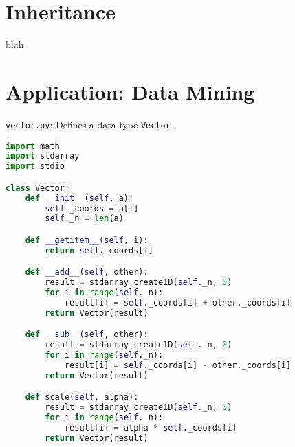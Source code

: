 \documentclass[8pt,a4paper,compress,handout]{beamer}
\begin{document}
\section{Inheritance}
\begin{frame}[fragile]
blah
\end{frame}

\section{Application: Data Mining}
\begin{frame}[fragile]
\begin{framed}
\tiny \lstinline{vector.py}: Defines a data type \lstinline{Vector}.
\end{framed}

\begin{lstlisting}[language=Python]
import math
import stdarray
import stdio

class Vector:
    def __init__(self, a):
        self._coords = a[:]
        self._n = len(a)

    def __getitem__(self, i):
        return self._coords[i]

    def __add__(self, other):
        result = stdarray.create1D(self._n, 0)
        for i in range(self._n):
            result[i] = self._coords[i] + other._coords[i]
        return Vector(result)

    def __sub__(self, other):
        result = stdarray.create1D(self._n, 0)
        for i in range(self._n):
            result[i] = self._coords[i] - other._coords[i]
        return Vector(result)

    def scale(self, alpha):
        result = stdarray.create1D(self._n, 0)
        for i in range(self._n):
            result[i] = alpha * self._coords[i]
        return Vector(result)
\end{lstlisting}
\end{frame}
\end{document}
